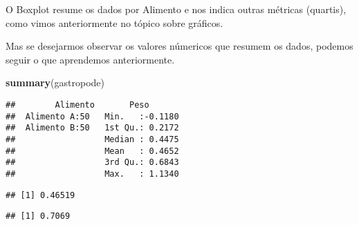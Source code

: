\documentclass[titlepage, oneside, openany, a4paper]{book}
\newenvironment{Shaded}{\begin{snugshade}}{\end{snugshade}}
\newcommand{\KeywordTok}[1]{\textcolor[rgb]{0.13,0.29,0.53}{\textbf{#1}}}
\newcommand{\NormalTok}[1]{#1}
\newcommand{\OperatorTok}[1]{\textcolor[rgb]{0.81,0.36,0.00}{\textbf{#1}}}
\newcommand{\StringTok}[1]{\textcolor[rgb]{0.31,0.60,0.02}{#1}}
\begin{document}
O Boxplot resume os dados por Alimento e nos indica outras métricas (quartis), como vimos anteriormente no tópico sobre gráficos.

Mas se desejarmos observar os valores númericos que resumem os dados, podemos seguir o que aprendemos anteriormente.

\begin{Shaded}
\begin{Highlighting}[]
\KeywordTok{summary}\NormalTok{(gastropode)}
\end{Highlighting}
\end{Shaded}

\begin{verbatim}
##        Alimento       Peso        
##  Alimento A:50   Min.   :-0.1180  
##  Alimento B:50   1st Qu.: 0.2172  
##                  Median : 0.4475  
##                  Mean   : 0.4652  
##                  3rd Qu.: 0.6843  
##                  Max.   : 1.1340
\end{verbatim}

\begin{Shaded}
\end{Shaded}

\begin{verbatim}
## [1] 0.46519
\end{verbatim}

\begin{Shaded}
\end{Shaded}

\begin{verbatim}
## [1] 0.7069
\end{verbatim}

\begin{Shaded}
\end{Shaded}
\end{document}

